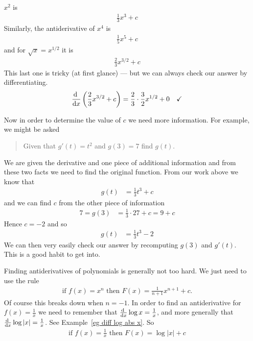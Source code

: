 $x^2$ is
\begin{align*}
  \frac{1}{3}x^3 + c
\end{align*}
Similarly, the antiderivative of $x^4$ is
\begin{align*}
  \frac{1}{5}x^5 + c
\end{align*}
and for $\sqrt{x} = x^{1/2}$ it is
\begin{align*}
  \frac{2}{3}x^{3/2} + c
\end{align*}
This last one is tricky (at first glance) --- but we can always check our answer by
differentiating.
\begin{align*}
  \diff{}{x} \left(\frac{2}{3}x^{3/2} + c \right) &=
 \frac{2}{3} \cdot \frac{3}{2} x^{1/2} + 0 & \checkmark
\end{align*}

Now in order to determine the value of $c$ we need more information. For example, we
might be asked
\begin{quote}
  Given that $g'(t) = t^2$ and $g(3)=7$ find $g(t)$.
\end{quote}
We are given the derivative and one piece of additional information and from these
two facts we need to find the original function. From our work above we know that
\begin{align*}
  g(t) &= \frac{1}{3}t^3 + c
\end{align*}
and we can find $c$ from the other piece of information
\begin{align*}
  7 = g(3) &= \frac{1}{3} \cdot 27 + c = 9+c
\end{align*}
Hence $c=-2$ and so
\begin{align*}
  g(t) &= \frac{1}{3}t^3 -2
\end{align*}
We can then very easily check our answer by recomputing $g(3)$ and $g'(t)$. This is a
good habit to get into.


Finding antiderivatives of polynomials is generally not too hard. We just
need to use the rule
\begin{align*}
  \text{if } f(x) = x^n \text{ then } F(x) = \frac{1}{n+1} x^{n+1} + c.
\end{align*}
Of course this breaks down when $n=-1$. In order to find an antiderivative
for $f(x)=\frac{1}{x}$ we need to remember that $\diff{}{x}\log x =
\frac{1}{x}$, and more generally that $\diff{}{x}\log |x| = \frac{1}{x}$. See
Example~\ref{eg diff log abs x}. So
\begin{align*}
	    \text{if } f(x)=\frac{1}{x}
	    \text{ then } F(x) = \log|x| + c
\end{align*}

